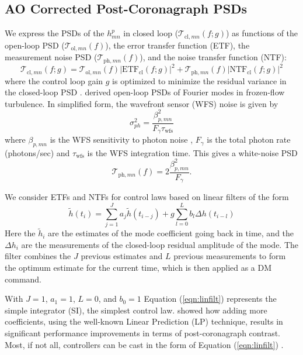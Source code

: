 \documentclass[10pt,preprint]{aastex631}
\begin{document}
\subsection{AO Corrected Post-Coronagraph PSDs}

We express the PSDs of the $h_{mn}^p$ in closed loop ($\mathcal{T}_{\mathrm{cl},mn}(f;g)$) as functions of the open-loop PSD ($\mathcal{T}_{\mathrm{ol},mn}(f)$), the error transfer function (ETF), the measurement noise PSD ($\mathcal{T}_{\mathrm{ph},mn}(f)$), and the noise transfer function (NTF): 
\begin{equation}
\mathcal{T}_{\mathrm{cl},mn}(f;g) = \mathcal{T}_{\mathrm{ol},mn}(f) \left| \mbox{ETF}_{\mathrm{cl}}(f;g) \right|^2 + \mathcal{T}_{\mathrm{ph},mn}(f) \left| \mbox{NTF}_{\mathrm{cl}}(f;g) \right|^2 
\label{eqn:cl_psd}
\end{equation}
where the control loop gain $g$ is optimized to minimize the residual variance in the closed-loop PSD \citep{1999aoa..book.....R_ch6,2016ApOpt..55..323P}. \citet{2018JATIS...4a9001M} derived open-loop PSDs of Fourier modes in frozen-flow turbulence.  In simplified form, the wavefront sensor (WFS) noise is given by
\begin{equation}
\sigma_{ph}^2 = \frac{\beta_{p,mn}^2}{F_\gamma \tau_\mathrm{wfs}}
\label{eqn:photon_noise}
\end{equation}
where $\beta_{p,mn}$ is the WFS sensitivity to photon noise \citep{2005ApJ...629..592G}, $F_\gamma$ is the total photon rate (photons/sec) and $\tau_\mathrm{wfs}$ is the WFS integration time.  This gives a white-noise PSD
\begin{equation}
\mathcal{T}_{\mathrm{ph},mn}(f) = 2\frac{\beta_{p,mn}^2}{F_\gamma }.
\end{equation}


We consider ETFs and NTFs for control laws based on linear filters of the form
\begin{equation}
\widetilde{h} (t_i) = \sum_{j=1}^J a_j \widetilde{h}(t_{i-j}) + g\sum_{l=0}^L b_l \Delta h (t_{i-l})  
\label{eqn:linfilt}
\end{equation}
Here the $\widetilde{h}_i$ are the estimates of the mode coefficient going back in time, and  the $\Delta h_i$ are the measurements of the closed-loop residual amplitude of the mode.  The filter combines the $J$ previous estimates and $L$ previous measurements to form the optimum estimate for the current time, which is then applied as a DM command.  

With $J=1$, $a_1 = 1$, $L=0$, and $b_0 = 1$ Equation (\ref{eqn:linfilt}) represents the simple integrator (SI), the simplest control law.  \citet{2018JATIS...4a9001M} showed how adding more coefficients, using the well-known Linear Prediction (LP) technique, results in significant performance improvements in terms of post-coronagraph contrast.  Most, if not all, controllers can be cast in the form of Equation (\ref{eqn:linfilt}) \citep{2007JOSAA..24.2645P}. 
\end{document}
